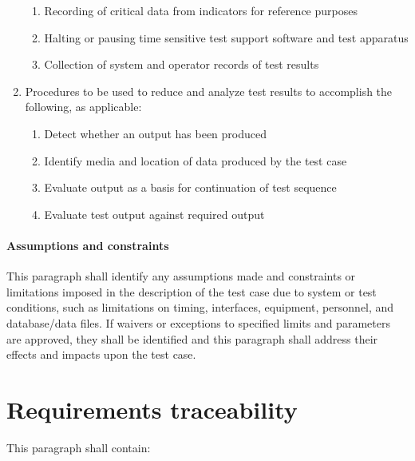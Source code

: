 \begin{enumerate}
  \begin{enumerate}
  \itemsep1pt\parskip0pt
  \item
    Recording of critical data from indicators for reference purposes
  \item
    Halting or pausing time sensitive test support software and test
    apparatus
  \item
    Collection of system and operator records of test results
  \end{enumerate}
\item
  Procedures to be used to reduce and analyze test results to accomplish
  the following, as applicable:

  \begin{enumerate}
  \itemsep1pt\parskip0pt
  \item
    Detect whether an output has been produced
  \item
    Identify media and location of data produced by the test case
  \item
    Evaluate output as a basis for continuation of test sequence
  \item
    Evaluate test output against required output
  \end{enumerate}
\end{enumerate}

\paragraph{Assumptions and constraints}

This paragraph shall identify any assumptions made and constraints or
limitations imposed in the description of the test case due to system or
test conditions, such as limitations on timing, interfaces, equipment,
personnel, and database/data files. If waivers or exceptions to
specified limits and parameters are approved, they shall be identified
and this paragraph shall address their effects and impacts upon the test
case.

\section{Requirements traceability}

This paragraph shall contain:

